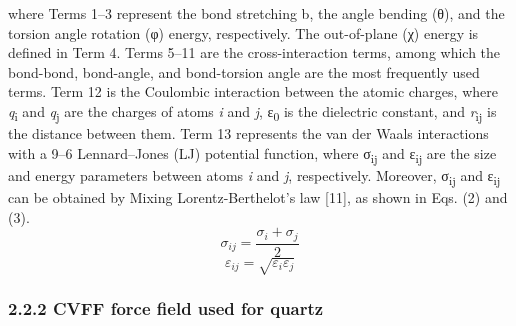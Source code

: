 \documentclass{article}
\begin{document}
where Terms 1–3 represent the bond stretching b, the angle bending (θ), and the torsion angle rotation (φ) energy, respectively. The out-of-plane (χ) energy is defined in Term 4. Terms 5–11 are the cross-interaction terms, among which the bond-bond, bond-angle, and bond-torsion angle are the most frequently used terms. Term 12 is the Coulombic interaction between the atomic charges, where \emph{q}\textsubscript{i} and \emph{q}\textsubscript{j} are the charges of atoms \emph{i} and \emph{j}, ε\textsubscript{0} is the dielectric constant, and \emph{r}\textsubscript{ij} is the distance between them. Term 13 represents the van der Waals interactions with a 9–6 Lennard–Jones (LJ) potential function, where σ\textsubscript{ij} and ε\textsubscript{ij} are the size and energy parameters between atoms \emph{i} and \emph{j}, respectively. Moreover, σ\textsubscript{ij} and ε\textsubscript{ij} can be obtained by Mixing Lorentz-Berthelot’s law [11], as shown in Eqs. (2) and (3).
\begin{equation}
\sigma_{ij}=\frac{\sigma_i+\sigma_j}{2}\tag{2}
\end{equation}
\begin{equation}
\varepsilon_{ij}=\sqrt{\varepsilon_i\varepsilon_j}\tag{3}
\end{equation}

\subsubsection*{2.2.2 CVFF force field used for quartz}
\end{document}
